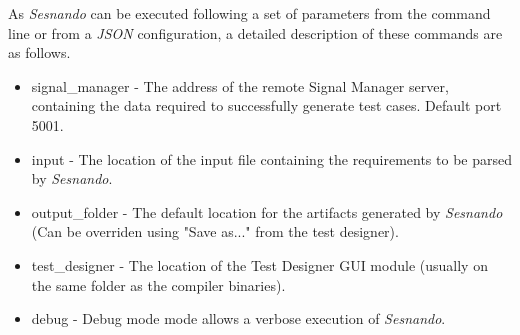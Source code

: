 As \textit{Sesnando} can be executed following a set of parameters from the command line or from a \textit{JSON} configuration, a detailed description of these commands are as follows.

\begin{itemize}
    \item signal\_manager - The address of the remote Signal Manager server, containing the data required to successfully generate test cases. Default port 5001.
    \item input - The location of the input file containing the requirements to be parsed by \textit{Sesnando}.
    \item output\_folder - The default location for the artifacts generated by \textit{Sesnando} (Can be overriden using "Save as..." from the test designer).
    \item test\_designer - The location of the Test Designer GUI module (usually on the same folder as the compiler binaries).
    \item debug - Debug mode mode allows a verbose execution of \textit{Sesnando}.
    
\end{itemize}

